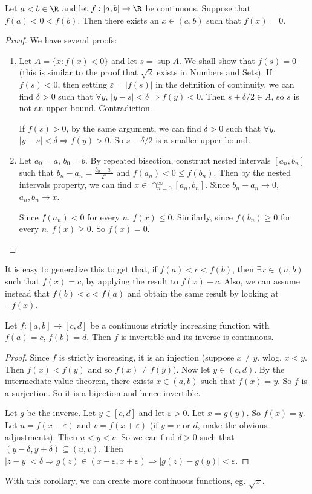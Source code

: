 \documentclass[a4paper]{article}
\begin{document}
\begin{thm}
  Let $a < b\in \R$ and let $f: [a, b] \to \R$ be continuous. Suppose that $f(a) < 0 < f(b)$. Then there exists an $x\in (a, b)$ such that $f(x) = 0$.
\end{thm}

\begin{proof}
  We have several proofs:
  \begin{enumerate}
    \item Let $A = \{x: f(x) < 0\}$ and let $s = \sup A$. We shall show that $f(s) = 0$ (this is similar to the proof that $\sqrt{2}$ exists in Numbers and Sets). If $f(s) < 0$, then setting $\varepsilon = |f(s)|$ in the definition of continuity, we can find $\delta > 0$ such that $\forall y$, $|y - s| < \delta \Rightarrow f(y) < 0$. Then $s + \delta/2 \in A$, so $s$ is not an upper bound. Contradiction.

    If $f(s) > 0$, by the same argument, we can find $\delta > 0$ such that $\forall y$, $|y - s| < \delta \Rightarrow f(y) > 0$. So $s - \delta/2$ is a smaller upper bound.
  \item Let $a_0 = a$, $b_0 = b$. By repeated bisection, construct nested intervals $[a_n, b_n]$ such that $b_n - a_n = \frac{b_0 - a_0}{2^n}$ and $f(a_n) < 0 \leq f(b_n)$. Then by the nested intervals property, we can find $x\in \cap_{n = 0}^\infty [a_n, b_n]$. Since $b_n - a_n \to 0$, $a_n, b_n \to x$.

    Since $f(a_n) < 0$ for every $n$, $f(x) \leq 0$. Similarly, since $f(b_n) \geq 0$ for every $n$, $f(x) \geq 0$. So $f(x) = 0$.
  \end{enumerate}
\end{proof}
It is easy to generalize this to get that, if $f(a) < c < f(b)$, then $\exists x\in (a, b)$ such that $f(x) = c$, by applying the result to $f(x) - c$. Also, we can assume instead that $f(b) < c < f(a)$ and obtain the same result by looking at $-f(x)$.

\begin{cor}
  Let $f: [a, b]\to [c, d]$ be a continuous strictly increasing function with $f(a) = c$, $f(b) = d$. Then $f$ is invertible and its inverse is continuous.
\end{cor}

\begin{proof}
  Since $f$ is strictly increasing, it is an injection (suppose $x \not= y$. wlog, $x < y$. Then $f(x) < f(y)$ and so $f(x) \not= f(y)$). Now let $y\in (c, d)$. By the intermediate value theorem, there exists $x\in (a, b)$ such that $f(x) = y$. So $f$ is a surjection. So it is a bijection and hence invertible.

  Let $g$ be the inverse. Let $y\in [c, d]$ and let $\varepsilon > 0$. Let $x = g(y)$. So $f(x) = y$. Let $u = f(x - \varepsilon)$ and $v = f(x + \varepsilon)$ (if $y = c$ or $d$, make the obvious adjustments). Then $u < y < v$. So we can find $\delta > 0$ such that $(y - \delta , y + \delta) \subseteq (u, v)$. Then $|z - y| < \delta \Rightarrow g(z) \in (x - \varepsilon, x + \varepsilon) \Rightarrow |g(z) - g(y)| < \varepsilon$.
\end{proof}
With this corollary, we can create more continuous functions, eg. $\sqrt{x}$.
\end{document}
